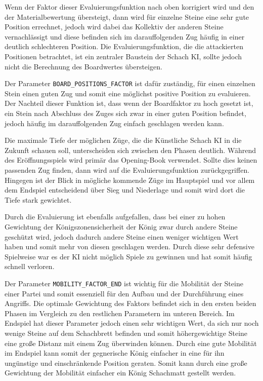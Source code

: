 Wenn der Faktor dieser Evaluierungsfunktion nach oben korrigiert wird und den der Materialbewertung übersteigt, dann wird für einzelne Steine eine sehr gute Position errechnet, jedoch wird dabei das Kollektiv der anderen Steine vernachlässigt und diese befinden sich im darauffolgenden Zug häufig in einer deutlich schlechteren Position. Die Evaluierungsfunktion, die die attackierten Positionen betrachtet, ist ein zentraler Baustein der Schach KI, sollte jedoch nicht die Berechnung des Boardwertes übersteigen.

Der Parameter \texttt{BOARD\_POSITIONS\_FACTOR} ist dafür zuständig, für einen einzelnen Stein einen guten Zug und somit eine möglichst positive Position zu evaluieren. Der Nachteil dieser Funktion ist, dass wenn der Boardfaktor zu hoch gesetzt ist, ein Stein nach Abschluss des Zuges sich zwar in einer guten Position befindet, jedoch häufig im darauffolgenden Zug einfach geschlagen werden kann.

Die maximale Tiefe der möglichen Züge, die die Künstliche Schach KI in die Zukunft schauen soll, unterscheiden sich zwischen den Phasen deutlich. Während des Eröffnungsspiels wird primär das Opening-Book verwendet. Sollte dies keinen passenden Zug finden, dann wird auf die Evaluierungsfunktion zurückgegriffen. Hingegen ist der Blick in mögliche kommende Züge im Hauptspiel und vor allem dem Endspiel entscheidend über Sieg und Niederlage und somit wird dort die Tiefe stark gewichtet.

Durch die Evaluierung ist ebenfalls aufgefallen, dass bei einer zu hohen Gewichtung der Königszonensicherheit der König zwar durch andere Steine geschützt wird, jedoch dadurch andere Steine einen weniger wichtigen Wert haben und somit mehr von diesen geschlagen werden. Durch diese sehr defensive Spielweise war es der KI nicht möglich Spiele zu gewinnen und hat somit häufig schnell verloren.

Der Parameter \texttt{MOBILITY\_FACTOR\_END} ist wichtig für die Mobilität der Steine einer Partei und somit essenziell für den Aufbau und der Durchführung eines Angriffs. Die optimale Gewichtung des Faktors befindet sich in den ersten beiden Phasen im Vergleich zu den restlichen Parametern im unteren Bereich. Im Endspiel hat dieser Parameter jedoch einen sehr wichtigen Wert, da sich nur noch wenige Steine auf dem Schachbrett befinden und somit höhergewichtige Steine eine große Distanz mit einem Zug überwinden können. Durch eine gute Mobilität im Endspiel kann somit der gegnerische König einfacher in eine für ihn ungünstige und einschränkende Position geraten. Somit kann durch eine große Gewichtung der Mobilität einfacher ein König Schachmatt gestellt werden.

